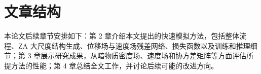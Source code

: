 \section{文章结构}

本论文后续章节安排如下：第 2 章介绍本文提出的快速模拟方法，包括整体流程、ZA 大尺度结构生成、位移场与速度场残差网络、损失函数以及训练和推理细节；第 3 章展示研究成果，从暗物质密度场、速度场和协方差矩阵等方面评估所提方法的性能；第 4 章总结全文工作，并讨论后续可能的改进方向。

%
%
%
%
%
%
%
